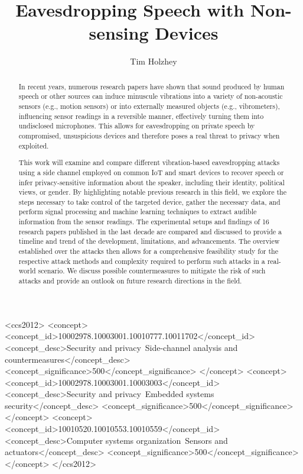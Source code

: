 \documentclass[sigconf, nonacm]{acmart}
\begin{document}
\title{Eavesdropping Speech with Non-sensing Devices}

\author{Tim Holzhey}

\begin{abstract}
  In recent years, numerous research papers have shown that sound produced by human speech or other sources can induce minuscule vibrations into a variety of non-acoustic sensors (e.g., motion sensors) or into externally measured objects (e.g., vibrometers), influencing sensor readings in a reversible manner, effectively turning them into undisclosed microphones.
  This allows for eavesdropping on private speech by compromised, unsuspicious devices and therefore poses a real threat to privacy when exploited.

  This work will examine and compare different vibration-based eavesdropping attacks using a side channel employed on common IoT and smart devices to recover speech or infer privacy-sensitive information about the speaker, including their identity, political views, or gender.
  By highlighting notable previous research in this field, we explore the steps necessary to take control of the targeted device, gather the necessary data, and perform signal processing and machine learning techniques to extract audible information from the sensor readings.
  The experimental setups and findings of 16 research papers published in the last decade are compared and discussed to provide a timeline and trend of the development, limitations, and advancements.
  The overview established over the attacks then allows for a comprehensive feasibility study for the respective attack methods and complexity required to perform such attacks in a real-world scenario.
  We discuss possible countermeasures to mitigate the risk of such attacks and provide an outlook on future research directions in the field.
\end{abstract}

\begin{CCSXML}
  <ccs2012>
  <concept>
  <concept_id>10002978.10003001.10010777.10011702</concept_id>
  <concept_desc>Security and privacy~Side-channel analysis and countermeasures</concept_desc>
  <concept_significance>500</concept_significance>
  </concept>
  <concept>
  <concept_id>10002978.10003001.10003003</concept_id>
  <concept_desc>Security and privacy~Embedded systems security</concept_desc>
  <concept_significance>500</concept_significance>
  </concept>
  <concept>
  <concept_id>10010520.10010553.10010559</concept_id>
  <concept_desc>Computer systems organization~Sensors and actuators</concept_desc>
  <concept_significance>500</concept_significance>
  </concept>
  </ccs2012>
\end{CCSXML}
\end{document}
